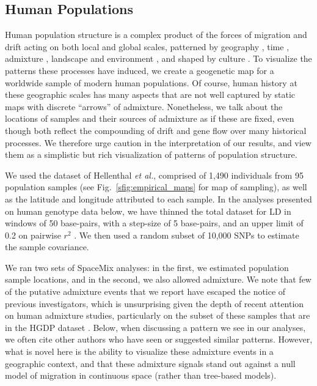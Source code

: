 \documentclass[10pt,letterpaper]{article}
\begin{document}
\subsection*{Human Populations}
Human population structure is a complex product of the forces of migration and drift acting on both local and global scales, patterned by geography \cite{novembre_genes_2008, ralph2013geography}, time \cite{skoglund2012origins, skoglund_investigating_2014}, admixture \cite{Hellenthal},  landscape and environment \cite{Beall2010, Bigham2010, Bradburd2013}, and shaped by culture \cite{reich_india_2009, Atzmon2010, moorjani_history_2011}. To visualize the patterns these processes have induced, we create a geogenetic map for a worldwide sample of modern human populations. 
Of course, human history at these geographic scales has many aspects that are not well captured by 
static maps with discrete ``arrows'' of admixture.
Nonetheless, we talk about the locations of samples and their sources of admixture as if these are fixed,
even though both reflect the compounding of drift and gene flow over many historical processes.  
We therefore urge caution in the interpretation of our results, 
and view them as a simplistic but rich visualization of patterns of population structure.

We used the dataset of Hellenthal \emph{et al.}\cite{Hellenthal}, 
comprised of 1,490 individuals from 95 population samples (see Fig.\ \ref{sfig:empirical_maps} for map of sampling), as well as the latitude and longitude attributed to each sample.  
In the analyses presented on human genotype data below, we have thinned the total dataset for LD in windows of 50 base-pairs, with a step-size of 5 base-pairs, and an upper limit of 0.2 on pairwise $r^2$ \cite{Purcell_etal_2007,plink}.  We then used a random subset of 10,000 SNPs to estimate the sample covariance.

We ran two sets of SpaceMix analyses: in the first, we estimated population sample locations, 
and in the second, we also allowed admixture. 
We note that few of the putative admixture events that we report have escaped the notice of previous investigators, 
which is unsurprising given the depth of recent attention on human admixture studies, particularly on the subset of these samples that are in the HGDP dataset
\cite{rosenberg_genetic_2002,li_worldwide_2008,Loh:13,patterson_ancient_2012,Hellenthal}. 
Below, when discussing a pattern we see in our analyses, we often cite other authors who have seen or suggested similar patterns.
However, what is novel here is the ability to visualize these admixture events in a geographic context, 
and that these admixture signals stand out against a null model of migration in continuous space (rather than tree-based models).
\end{document}
